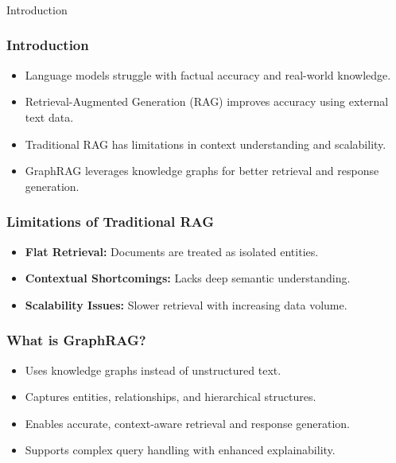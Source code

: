 \begin{frame}[fragile]\frametitle{}
\begin{center}
{\Large Introduction}
\end{center}
\end{frame}

\begin{frame}[fragile]\frametitle{Introduction}
    \begin{itemize}
        \item Language models struggle with factual accuracy and real-world knowledge.
        \item Retrieval-Augmented Generation (RAG) improves accuracy using external text data.
        \item Traditional RAG has limitations in context understanding and scalability.
        \item GraphRAG leverages knowledge graphs for better retrieval and response generation.
    \end{itemize}
\end{frame}

\begin{frame}[fragile]\frametitle{Limitations of Traditional RAG}
    \begin{itemize}
        \item \textbf{Flat Retrieval:} Documents are treated as isolated entities.
        \item \textbf{Contextual Shortcomings:} Lacks deep semantic understanding.
        \item \textbf{Scalability Issues:} Slower retrieval with increasing data volume.
    \end{itemize}
\end{frame}

\begin{frame}[fragile]\frametitle{What is GraphRAG?}
    \begin{itemize}
        \item Uses knowledge graphs instead of unstructured text.
        \item Captures entities, relationships, and hierarchical structures.
        \item Enables accurate, context-aware retrieval and response generation.
        \item Supports complex query handling with enhanced explainability.
    \end{itemize}
\end{frame}

